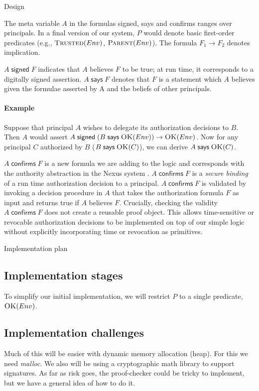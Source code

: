 \documentclass[10pt]{article}
\newcommand{\sign}[2]{\ensuremath{#1\;\textsf{signed}\;#2}}
\newcommand{\imp}[2]{\ensuremath{#1 \rightarrow #2}}
\newcommand{\says}[2]{\ensuremath{#1\;\textsf{says}\;#2}}
\newcommand{\confirms}[2]{\ensuremath{#1\;\textsf{confirms}\;#2}}
\newcommand{\pred}[2]{\ensuremath{\textsc{#1}(#2)}}
\begin{document}
\begin{section}{Design}
\medskip

The meta variable $A$ in the formulas \textsf{signed}, \textsf{says} and \textsf{confirms} ranges over principals.
In a final version of our system, $P$ would denote basic first-order predicates (e.g., \pred{Trusted}{Env}, \pred{Parent}{Env}).
The formula \imp{F_1}{F_2} denotes implication. 

\sign{A}{F} indicates that $A$ believes $F$ to be true; at run time, it corresponds to a digitally signed assertion.
\says{A}{F} denotes that $F$ is a statement which $A$ believes given the formulae asserted by A and the beliefs of other principals.

\paragraph{Example} Suppose that principal $A$ wishes to delegate its authorization decisions to $B$. Then $A$ would assert \sign{A}{\imp{(\says{B}{\pred{OK}{Env}})}{\pred{OK}{Env}}}. Now for any principal $C$ authorized by $B$ (\says{B}{\pred{OK}{C}}), we can derive \says{A}{\pred{OK}{C}}.

\medskip

\confirms{A}{F} is a new formula we are adding to the logic and corresponds with the authority abstraction in the Nexus system \cite{Nexus}. 
\confirms{A}{F} is a \emph{secure binding} of a run time authorization decision to a principal. \confirms{A}{F} is validated by invoking a decision procedure in $A$ that takes the authorization formula $F$ as input and returns true if $A$ believes $F$.
Crucially, checking the validity $\confirms{A}{F}$ does not create a reusable proof object.
This allows time-sensitive or revocable authorization decisions to be implemented on top of our simple logic without explicitly incorporating time or revocation as primitives.
\end{section}

\begin{section}{Implementation plan}

\subsection{Implementation stages}

To simplify our initial implementation, we will restrict $P$ to a single predicate, \pred{OK}{Env}.

\subsection{Implementation challenges}

Much of this will be easier with dynamic memory allocation (heap).  
For this we need \emph{malloc}.  
We also will be using a cryptographic math library to support signatures. 
As far as risk goes, the proof-checker could be tricky to implement, but we have a general idea of how to do it.
\end{section}
\end{document}
